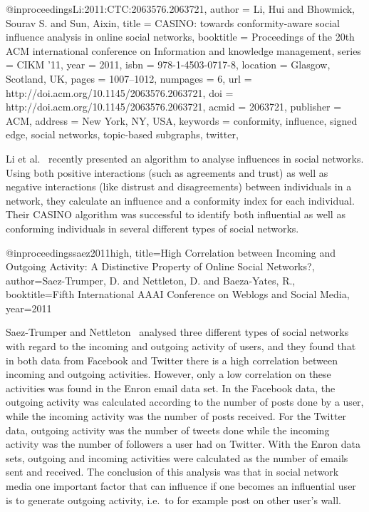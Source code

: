 

@inproceedings{Li:2011:CTC:2063576.2063721,
 author = {Li, Hui and Bhowmick, Sourav S. and Sun, Aixin},
 title = {CASINO: towards conformity-aware social influence analysis in online social networks},
 booktitle = {Proceedings of the 20th ACM international conference on Information and knowledge management},
 series = {CIKM '11},
 year = {2011},
 isbn = {978-1-4503-0717-8},
 location = {Glasgow, Scotland, UK},
 pages = {1007--1012},
 numpages = {6},
 url = {http://doi.acm.org/10.1145/2063576.2063721},
 doi = {http://doi.acm.org/10.1145/2063576.2063721},
 acmid = {2063721},
 publisher = {ACM},
 address = {New York, NY, USA},
 keywords = {conformity, influence, signed edge, social networks, topic-based subgraphs, twitter},
} 

Li et al.~\cite{Li:2011:CTC:2063576.2063721} recently presented an
algorithm to analyse influences in social networks. Using both positive
interactions (such as agreements and trust) as well as negative
interactions (like distrust and disagreements) between individuals in
a network, they calculate an influence and a conformity index for each
individual. Their CASINO algorithm was successful to identify both
influential as well as conforming individuals in several
different types of social networks.



@inproceedings{saez2011high,
  title={High Correlation between Incoming and Outgoing Activity: A Distinctive Property of Online Social Networks?},
  author={Saez-Trumper, D. and Nettleton, D. and Baeza-Yates, R.},
  booktitle={Fifth International AAAI Conference on Weblogs and Social Media},
  year={2011}
}

Saez-Trumper and Nettleton~\cite{saez2011high} analysed three
different types of social networks with regard to the incoming and
outgoing activity of users, and they found that in both data from
Facebook and Twitter there is a high correlation between incoming and
outgoing activities. However, only a low correlation on these
activities was found in the Enron email data set. In the Facebook
data, the outgoing activity was calculated according to the number of
posts done by a user, while the incoming activity was the number of
posts received. For the Twitter data, outgoing activity was the number
of tweets done while the incoming activity was the number of followers
a user had on Twitter. With the Enron data sets, outgoing and incoming
activities were calculated as the number of emails sent and received.
The conclusion of this analysis was that in social network media one
important factor that can influence if one becomes an influential user
is to generate outgoing activity, i.e.\ to for example post on other
user's wall.

